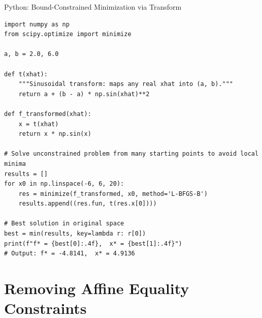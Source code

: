 \documentclass[aspectratio=169,10pt]{beamer}
\begin{document}
\begin{frame}[fragile]{Python: Bound-Constrained Minimization via Transform}
  \begin{lstlisting}[style=pycode,caption={Example 10.1 in Python --- bound-constrained minimization using sinusoidal transform}]
import numpy as np
from scipy.optimize import minimize

a, b = 2.0, 6.0

def t(xhat):
    """Sinusoidal transform: maps any real xhat into (a, b)."""
    return a + (b - a) * np.sin(xhat)**2

def f_transformed(xhat):
    x = t(xhat)
    return x * np.sin(x)

# Solve unconstrained problem from many starting points to avoid local minima
results = []
for x0 in np.linspace(-6, 6, 20):
    res = minimize(f_transformed, x0, method='L-BFGS-B')
    results.append((res.fun, t(res.x[0])))

# Best solution in original space
best = min(results, key=lambda r: r[0])
print(f"f* = {best[0]:.4f},  x* = {best[1]:.4f}")
# Output: f* = -4.8141,  x* = 4.9136
  \end{lstlisting}
\end{frame}

\section{Removing Affine Equality Constraints}
\end{document}
